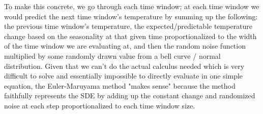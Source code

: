 \documentclass{article}
\begin{document}
{To make this concrete, we go through each time window; at each time window we would predict the next time window's temperature by summing up the following: the previous time window's temperature, the expected/predictable temperature change based on the seasonality at that given time proportionalized to the width of the time window we are evaluating at, and then the random noise function multiplied by some randomly drawn value from a bell curve / normal distribution. Given that we can't do the actual calculus needed which is very difficult to solve and essentially impossible to directly evaluate in one simple equation, the Euler-Maruyama method "makes sense" because the method faithfully represents the SDE by adding up the constant change and randomized noise at each step proportionalized to each time window size. 

}
\end{document}
